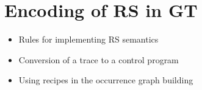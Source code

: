 

\section{Encoding of RS in GT}\label{sec:RS2GTS}
\begin{itemize}
\item Rules for implementing RS semantics
\item Conversion of a trace to a control program
\item Using recipes in the occurrence graph building
\end{itemize}

